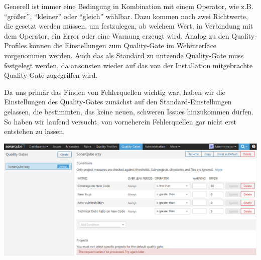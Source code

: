 Generell ist immer eine Bedingung in Kombination mit einem Operator, wie z.B. \enquote{größer}, \enquote{kleiner} oder \enquote{gleich} wählbar. Dazu kommen noch zwei Richtwerte, die gesetzt werden müssen, um festzulegen, ab welchem Wert, in Verbindung mit dem Operator, ein Error oder eine Warnung erzeugt wird. Analog zu den Quality-Profiles können die Einstellungen zum Quality-Gate im Webinterface vorgenommen werden. Auch das als Standard zu nutzende Quality-Gate muss festgelegt werden, da ansonsten wieder auf das von der Installation mitgebrachte Quality-Gate zugegriffen wird.

Da uns primär das Finden von Fehlerquellen wichtig war, haben wir die Einstellungen des Quality-Gates zunächst auf den Standard-Einstellungen gelassen, die bestimmten, das keine neuen, schweren Issues hinzukommen dürfen. So haben wir laufend versucht, von vorneherein Fehlerquellen gar nicht erst entstehen zu lassen.


\begin{minipage}{\linewidth}
	\centering
	\includegraphics[scale=0.55]{img/QualityGate.PNG}
	\vspace{2em}
\end{minipage}


